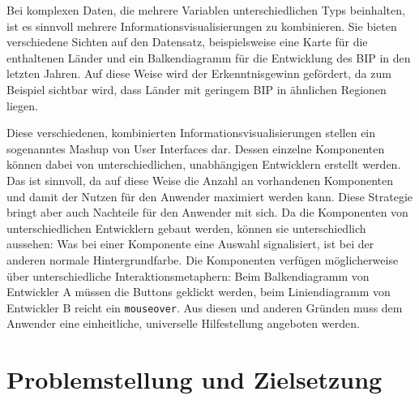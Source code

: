 \documentclass[
	headsepline,
	footsepline,
	fontsize=12pt,
	bibliography=totoc
]{scrbook}
\begin{document}

Bei komplexen Daten, die mehrere Variablen unterschiedlichen Typs beinhalten, ist es sinnvoll mehrere Informationsvisualisierungen zu kombinieren. Sie bieten verschiedene Sichten auf den Datensatz, beispielsweise eine Karte für die enthaltenen Länder und ein Balkendiagramm für die Entwicklung des BIP in den letzten Jahren. Auf diese Weise wird der Erkenntnisgewinn gefördert, da zum Beispiel sichtbar wird, dass Länder mit geringem BIP in ähnlichen Regionen liegen.


Diese verschiedenen, kombinierten Informationsvisualisierungen stellen ein sogenanntes Mashup von User Interfaces dar. Dessen einzelne Komponenten können dabei von unterschiedlichen, unabhängigen Entwicklern erstellt werden. Das ist sinnvoll, da auf diese Weise die Anzahl an vorhandenen Komponenten und damit der Nutzen für den Anwender maximiert werden kann. Diese Strategie bringt aber auch Nachteile für den Anwender mit sich. Da die Komponenten von unterschiedlichen Entwicklern gebaut werden, können sie unterschiedlich aussehen: Was bei einer Komponente eine Auswahl signalisiert, ist bei der anderen normale Hintergrundfarbe. Die Komponenten verfügen möglicherweise über unterschiedliche Interaktionsmetaphern: Beim Balkendiagramm von Entwickler A müssen die Buttons geklickt werden, beim Liniendiagramm von Entwickler B reicht ein \texttt{mouseover}. Aus diesen und anderen Gründen muss dem Anwender eine einheitliche, universelle Hilfestellung angeboten werden.


\section{Problemstellung und Zielsetzung}
\label{section:einleitung:problemstellung}

\end{document}
